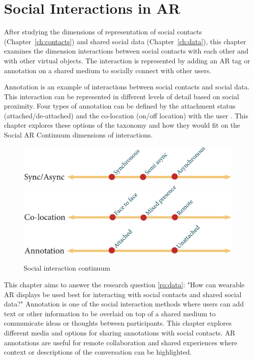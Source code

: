 \chapter{Social Interactions in AR}
\label{ch:annotation}

After studying the dimensions of representation of social contacts (Chapter~\ref{ch:contacts}) and shared social data (Chapter~\ref{ch:data}), this chapter examines the dimension interactions between social contacts with each other and with other virtual objects. The interaction is represented by adding an AR tag or annotation on a shared medium to socially connect with other users.

Annotation is an example of interactions between social contacts and social data. This interaction can be represented in different levels of detail based on social proximity. Four types of annotation can be defined by the attachment status (attached/de-attached) and the co-location (on/off location) with the user \cite{Hansen2006}. This chapter explores these options of the taxonomy and how they would fit on the Social AR Continuum dimensions of interactions. 

\begin{figure}[ht]
  \centering
  \includegraphics[width=\columnwidth]{images/30-continuum/continuum4_2-05.eps}
  \includegraphics[width=\columnwidth]{images/30-continuum/continuum4_2-06.eps}
  \includegraphics[width=\columnwidth]{images/30-continuum/continuum43-05.eps}
  \caption{Social interaction continuum}
  \label{fig:interaction:interaction-continuum}
\end{figure}

This chapter aims to answer the research question \ref{rq:data}: "How can wearable AR displays be used best for interacting with social contacts and shared social data?"
Annotation is one of the social interaction methods where users can add text or other information to be overlaid on top of a shared medium to communicate ideas or thoughts between participants. This chapter explores different media and options for sharing annotations with social contacts. AR annotations are useful for remote collaboration and shared experiences where context or descriptions of the conversation can be highlighted.

